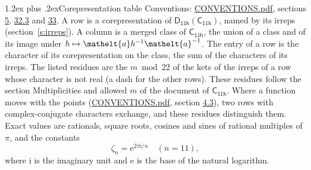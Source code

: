 \documentclass[10pt,a4paper]{article}
\makeatletter
\renewcommand\section{\@startsection{section}{1}{\z@}{-3ex plus -1ex minus -.2ex}%
  {1.2ex plus .2ex}{\normalfont\large\sffamily\bfseries\color{parttitle}}}
\numberwithin{equation}{section}
\newcommand{\eltfont}[1]{{\let\sigma\eltsigma\mathelt{#1}}}
\newcommand{\grp}[1]{\mathsf{#1}}
\newcommand{\elt}[1]{\eltfont{#1}}
\newcommand{\iunit}{\mathrm{i}}
\newcommand{\expe}{\mathrm{e}}
\newcommand{\rootunity}[1]{\zeta_{#1}}
\makeatother
\begin{document}
\section{Corepresentation table}\label{s:character_table}
Conventions: \href{../../CONVENTIONS.pdf}{CONVENTIONS.pdf}, sections \href{../../../rotation/CONVENTIONS.pdf\#conv.5}{5}, \href{../../CONVENTIONS.pdf\#conv.32.3}{32.3} and \href{../../CONVENTIONS.pdf\#conv.33}{33}.
A row is a corepresentation of $\grp{D_{11h}}(\grp{C_{11h}})$, named by its irreps (section~\ref{s:irreps}). A column is a merged class of $\grp{C_{11h}}$, the union of a class and of its image under $h \mapsto \elt{a} h^{-1} \elt{a}^{-1}$. The entry of a row is the character of its corepresentation on the class, the sum of the characters of its irreps.
\leavevmode\label{n:head.parity}The listed residues are the $m \bmod 22$ of the kets of the irreps of a row whose character is not real (a dash for the other rows). These residues follow the section Multiplicities and allowed $m$ of the document of \href{../../../rotation/data/pdf/C11h.pdf}{$\grp{C_{11h}}$}. Where a function moves with the points (\href{../../CONVENTIONS.pdf}{CONVENTIONS.pdf}, section \href{../../../rotation/CONVENTIONS.pdf\#conv.4.3}{4.3}), two rows with complex-conjugate characters exchange, and these residues distinguish them.
\leavevmode\label{n:constant.root}\label{n:index.root.order}Exact values are rationals, square roots, cosines and sines of rational multiples of $\pi$, and the constants
\begin{equation}\label{e:constants}\rootunity{n} = \expe^{2\pi\iunit/n}\quad(n = 11),\end{equation}
where $\iunit$ is the imaginary unit and $\expe$ is the base of the natural logarithm.
\end{document}
